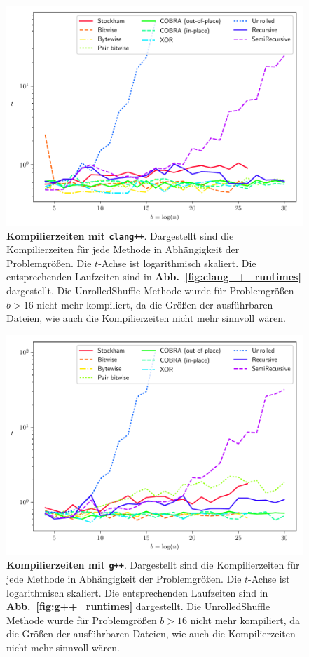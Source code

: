 \documentclass[10pt]{article}
\begin{document}
\begin{figure}[ht!]
\centering
  \includegraphics[width=4.5in]{results/clang++_compile_times.pdf}
\caption{{\bf Kompilierzeiten mit {\tt clang++}}. 
    Dargestellt sind die Kompilierzeiten für jede Methode in Abhängigkeit der Problemgrößen.
    Die $t$-Achse ist logarithmisch skaliert. Die entsprechenden Laufzeiten sind in 
    {\bf Abb.~\ref{fig:clang++_runtimes}} dargestellt. Die UnrolledShuffle Methode wurde 
    für Problemgrößen $b>16$ nicht mehr kompiliert, da die Größen der ausführbaren Dateien, 
    wie auch die Kompilierzeiten nicht mehr sinnvoll wären.
    \label{fig:clang++_compile_times}	
}
\end{figure}

\begin{figure}[ht!]
\centering
  \includegraphics[width=4.5in]{results/g++_compile_times.pdf}
\caption{{\bf Kompilierzeiten mit {\tt g++}}. 
    Dargestellt sind die Kompilierzeiten für jede Methode in Abhängigkeit der Problemgrößen.
    Die $t$-Achse ist logarithmisch skaliert. Die entsprechenden Laufzeiten sind in 
    {\bf Abb.~\ref{fig:g++_runtimes}} dargestellt. Die UnrolledShuffle Methode wurde 
    für Problemgrößen $b>16$ nicht mehr kompiliert, da die Größen der ausführbaren Dateien, 
    wie auch die Kompilierzeiten nicht mehr sinnvoll wären.
    \label{fig:g++_compile_times}	
}
\end{figure}
\end{document}
